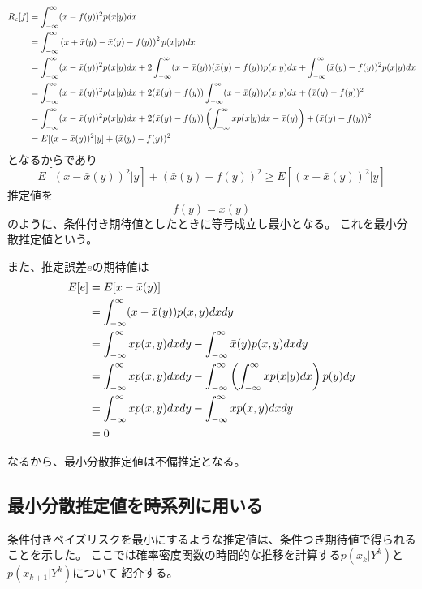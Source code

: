 \begin{align}
R_c[f] 
&=\int_{-\infty}^\infty
    (x-f(y))^2 p(x|y)dx		 			\notag\\
&=\int_{-\infty}^\infty
    \left(
    x + \bar{x}(y) -\bar{x}(y) -f(y)
    \right)^2 p(x|y)dx		 			\notag\\
&=\int_{-\infty}^\infty
		(x-\bar{x}(y))^2
     p(x|y)dx
     +
     2\int_{-\infty}^\infty
		(x-\bar{x}(y))(\bar{x}(y)-f(y))
	p(x|y)dx
	+
	\int_{-\infty}^\infty
		(\bar{x}(y)-f(y))^2
     p(x|y)dx    									\notag\\
&=\int_{-\infty}^\infty
		(x-\bar{x}(y))^2
     p(x|y)dx
     +
     2(\bar{x}(y)-f(y))\int_{-\infty}^\infty
		(x-\bar{x}(y))
	p(x|y)dx
	+
	(\bar{x}(y)-f(y))^2 				\notag\\
&=\int_{-\infty}^\infty
		(x-\bar{x}(y))^2
     p(x|y)dx
     +
     2(\bar{x}(y)-f(y))\left( \int_{-\infty}^\infty
		x
	p(x|y)dx -\bar{x}(y)
	\right)
	+
	(\bar{x}(y)-f(y))^2 				\notag\\
&=E[(x-\bar{x}(y))^2|y]+(\bar{x}(y)-f(y))^2  \notag\\
\end{align}
となるからであり
\begin{equation}
E[(x-\bar{x}(y))^2|y]+(\bar{x}(y)-f(y))^2 \geq E[(x-\bar{x}(y))^2|y]
\end{equation}
推定値を
\begin{equation}
f(y) = {x}(y)
\end{equation}
のように、条件付き期待値としたときに等号成立し最小となる。
これを最小分散推定値という。

また、推定誤差$e$の期待値は
\begin{align}
E[e]
&=
E[x-\bar{x}(y)] 						\notag\\
&=
\int_{-\infty}^\infty
	(x-\bar{x}(y))
p(x,y)dxdy 							\notag\\
&=
\int_{-\infty}^\infty
	x
p(x,y)dxdy
-
\int_{-\infty}^\infty
	\bar{x}(y)
p(x,y)dxdy  							\notag\\
&=
\int_{-\infty}^\infty
	x
p(x,y)dxdy
-
\int_{-\infty}^\infty
\left(
	\int_{-\infty}^\infty
		x
	p(x|y)dx
\right)
p(y)dy  							\notag\\ 
&=
\int_{-\infty}^\infty
	x
p(x,y)dxdy
-
\int_{-\infty}^\infty
	x
p(x,y)dxdy  							\notag\\ 
&=0 			\notag
\end{align}

なるから、最小分散推定値は不偏推定となる。

\subsection{最小分散推定値を時系列に用いる}
条件付きベイズリスクを最小にするような推定値は、条件つき期待値で得られることを示した。
ここでは確率密度関数の時間的な推移を計算する$p(x_k|Y^k)$と$p(x_{k+1}|Y^k)$について
紹介する。


